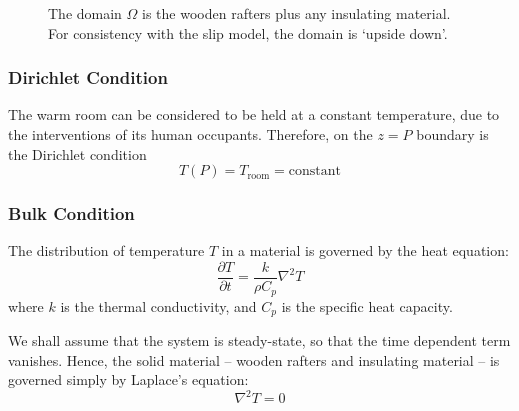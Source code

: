 \documentclass[12pt, a4paper, twoside, openright]{book}
\newcommand{\Tr}{\ensuremath{T_{\mathrm{room}}}}
\begin{document}
\begin{figure}[ht]
\centering
{}
\caption{The domain $\Omega$ is the wooden rafters plus any insulating material.
For consistency with the slip model, the domain is `upside down'.}
\label{insulationdomain}
\end{figure}


\subsubsection{Dirichlet Condition}

The warm room can be considered to be held at a constant temperature, due to the interventions of its human occupants.  Therefore, on the $z=P$ boundary is the Dirichlet condition
\begin{equation}
T(P) = \Tr = \text{constant}
\end{equation}

\subsubsection{Bulk Condition}

The distribution of temperature $T$ in a material is governed by the heat equation:
\begin{equation}
\frac{\partial T}{\partial t} = \frac{k}{\rho C_p} \nabla^2 T
\end{equation}
where $k$ is the thermal conductivity, and $C_p$ is the specific heat capacity.

We shall assume that the system is steady-state, so that the time dependent term vanishes.  Hence, the solid material -- wooden rafters and insulating material -- is governed simply by Laplace's equation:
\begin{equation}
\nabla^2 T = 0
\end{equation}
\end{document}
